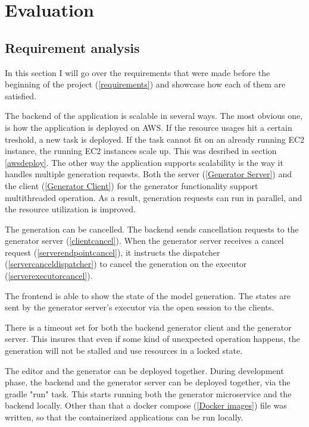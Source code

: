 \chapter{Evaluation}\label{Evaluation}

	\section{Requirement analysis}
	In this section I will go over the requirements that were made before the beginning of the project (\ref{requirements}) 
	and showcase how each of them are satisfied.

	The backend of the application is scalable in several ways. The most obvious one, is how the application is deployed on AWS. 
	If the resource usages hit a certain treshold, a new task is deployed. If the task cannot fit on an already running EC2 instance,
	the running EC2 instances scale up. This was desribed in section \ref{awsdeploy}. The other way the application supports 
	scalability is the way it handles multiple generation requests. Both the server (\ref{Generator Server}) and the client
	(\ref{Generator Client}) for the generator 
	functionality support multithreaded operation. As a result, generation requests can run in parallel, and the resource utilization
	is improved.

	The generation can be cancelled. The backend sends cancellation requests to the generator server (\ref{clientcancel}).
	When the generator server receives a cancel request (\ref{serverendpointcancel}), it instructs the dispatcher 
	(\ref{servercanceldispatcher}) to cancel the generation on the executor (\ref{serverexecutorcancel}).

	The frontend is able to show the state of the model generation. The states are sent by the generator server's executor via
	the open session to the clients.

	There is a timeout set for both the backend generator client and the generator server. This insures that even if some kind of 
	unexpected operation happens, the generation will not be stalled and use resources in a locked state.

	The editor and the generator can be deployed together. During development phase, the backend and the generator server can be 
	deployed together, via the gradle "run" task. This starts running both the generator microservice and the backend locally.
	Other than that a docker compose (\ref{Docker images}) file was written, so that the containerized applications can be run locally.

